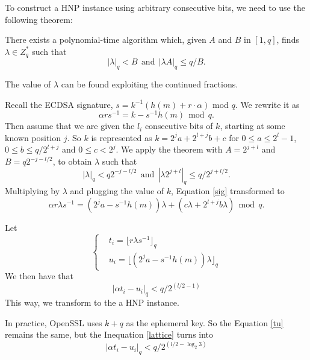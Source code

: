 To construct a HNP instance using arbitrary consecutive bits, we need to use the following theorem\cite{Nguyen2002}:
\begin{theorem}
 \label{theorem1}
There exists a polynomial-time algorithm which, given $A$ and $B$ in $[1, q]$, finds $\lambda \in Z^{*}_{q}$ such that
$$
|\lambda |_q < B  \ \  \text{and} \ \  |\lambda A|_q \leq q/B . 
$$ 
\end{theorem}
The value of $\lambda$ can be found exploiting the continued fractions.

Recall the ECDSA signature, $s = k^{-1} (h(m) + r\cdot\alpha)$ mod $q$.
We rewrite it as 
\begin{equation}
\label{sig}
\alpha rs^{-1} = k - s^{-1}h(m)  \ \  \text{mod} \ \ q.
\end{equation}
Then assume that we are given the $l_i$ consecutive bits of $k$, starting at some known position $j$.
 So $k$ is represented as $k = 2^{j}a + 2^{l+j}b +c$ for $0 \leq a \leq 2^l -1$, $0\leq b \leq q/2^{l+j}$ and $0 \leq c < 2^j$.
 We apply the theorem with $A = 2^{j+l}$ and $B = q2^{-j-l/2}$, to obtain $\lambda$ such that  
$$
|\lambda |_q < q2^{-j-l/2}  \ \  \text{and} \ \  |\lambda 2^{j+l}|_q \leq q/2^{j+l/2} . 
$$ 
Multiplying by $\lambda$ and plugging the value of $k$, Equation \ref{sig} transformed to 
$$
\alpha r\lambda s^{-1} = (2^{j}a - s^{-1}h(m))\lambda +(c\lambda + 2^{l+j}b\lambda)  \ \  \text{mod} \ \ q.
$$

 Let
 \begin{equation}
 \label{tu}
 \left\{
 \begin{aligned}
 	&t_i = \lfloor r\lambda s^{-1} \rfloor_q    \\
 	&u_i = \lfloor (2^{j}a - s^{-1}h(m))\lambda \rfloor_q 
 \end{aligned}
 \right.
 \end{equation} 
We then have that 
 \begin{equation}
\label{lattice}
    |\alpha t_i - u_i|_q < q/2^{(l/2-1)}
\end{equation}
This way, we transform to the a HNP instance.

In practice, OpenSSL uses $k+q$ as the ephemeral key. So the Equation \ref{tu} remains the same, but the Inequation \ref{lattice} turns into
 \begin{equation}
\label{lattice2}
    |\alpha t_i - u_i|_q < q/2^{(l/2-\log_{2}{3})}
\end{equation}

